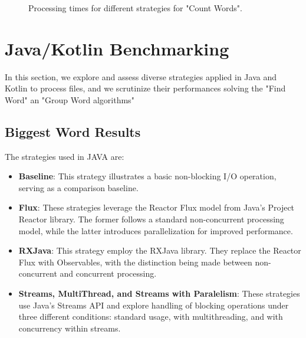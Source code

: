 \begin{figure}[H]
    \raggedright
    \caption{Processing times for different strategies for "Count Words".}
    \label{fig:group_word_processing_times_cs}
\end{figure}


\clearpage

\section{Java/Kotlin Benchmarking}
\label{sec:java_implementation}

In this section, we explore and assess diverse strategies applied in Java and Kotlin to process files, and we scrutinize their performances solving the "Find Word" an "Group Word algorithms"


\subsection{Biggest Word Results}
\label{subsubsec:biggest_word_results}

The strategies used in JAVA are:

\begin{itemize}
    \item \textbf{Baseline}: This strategy illustrates a basic non-blocking I/O operation, serving as a comparison baseline.
    \item \textbf{Flux}: These strategies leverage the Reactor Flux model from Java's Project Reactor library. The former follows a standard non-concurrent processing model, while the latter introduces parallelization for improved performance.
    \item \textbf{RXJava}: This strategy employ the RXJava library. They replace the Reactor Flux with Observables, with the distinction being made between non-concurrent and concurrent processing.
    \item \textbf{Streams, MultiThread, and Streams with Paralelism}: These strategies use Java's Streams API and explore handling of blocking operations under three different conditions: standard usage, with multithreading, and with concurrency within streams.
    
\end{itemize}


